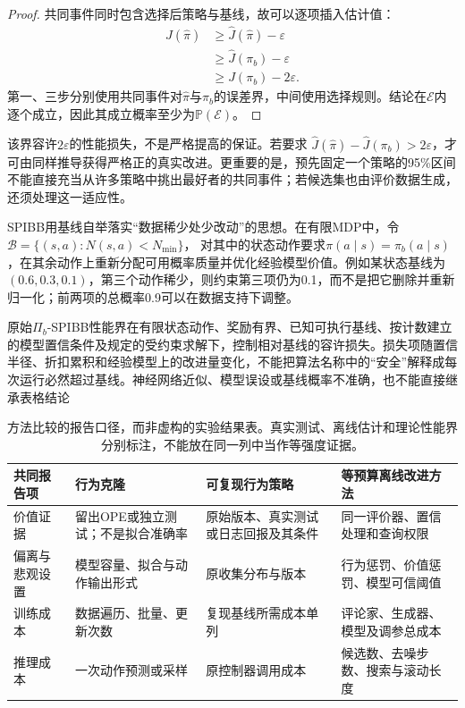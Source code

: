 \begin{proof}
  共同事件同时包含选择后策略与基线，故可以逐项插入估计值：
  \[
  \begin{aligned}
    J(\widehat\pi)
    &\geq\widehat J(\widehat\pi)-\varepsilon\\
    &\geq\widehat J(\pi_b)-\varepsilon\\
    &\geq J(\pi_b)-2\varepsilon.
  \end{aligned}
  \]
  第一、三步分别使用共同事件对$\widehat\pi$与$\pi_b$的误差界，中间使用选择规则。结论在$\mathcal E$内逐个成立，因此其成立概率至少为$\mathbb P(\mathcal E)$。
\end{proof}

该界容许$2\varepsilon$的性能损失，不是严格提高的保证。若要求
$\widehat J(\widehat\pi)-\widehat J(\pi_b)>2\varepsilon$，才可由同样推导获得严格正的真实改进。更重要的是，预先固定一个策略的95\%区间不能直接充当从许多策略中挑出最好者的共同事件；若候选集也由评价数据生成，还须处理这一适应性。

SPIBB用基线自举落实“数据稀少处少改动”的思想。在有限MDP中，令
$\mathcal B=\{(s,a):N(s,a)<N_{\min}\}$，
对其中的状态动作要求$\pi(a\mid s)=\pi_b(a\mid s)$，在其余动作上重新分配可用概率质量并优化经验模型价值。例如某状态基线为$(0.6,0.3,0.1)$，第三个动作稀少，则约束第三项仍为0.1，而不是把它删除并重新归一化；前两项的总概率0.9可以在数据支持下调整。

原始$\Pi_b$-SPIBB性能界在有限状态动作、奖励有界、已知可执行基线、按计数建立的模型置信条件及规定的受约束求解下，控制相对基线的容许损失。损失项随置信半径、折扣累积和经验模型上的改进量变化，不能把算法名称中的“安全”解释成每次运行必然超过基线。神经网络近似、模型误设或基线概率不准确，也不能直接继承表格结论

\begin{table}[t]
  \centering
  \small
  \begin{tabularx}{\linewidth}{p{28mm}XXX}
    \toprule
    共同报告项 & 行为克隆 & 可复现行为策略 & 等预算离线改进方法 \\
    \midrule
    价值证据 & 留出OPE或独立测试；不是拟合准确率 & 原始版本、真实测试或日志回报及其条件 & 同一评价器、置信处理和查询权限 \\
    偏离与悲观设置 & 模型容量、拟合与动作输出形式 & 原收集分布与版本 & 行为惩罚、价值惩罚、模型可信阈值 \\
    训练成本 & 数据遍历、批量、更新次数 & 复现基线所需成本单列 & 评论家、生成器、模型及调参总成本 \\
    推理成本 & 一次动作预测或采样 & 原控制器调用成本 & 候选数、去噪步数、搜索与滚动长度 \\
    \bottomrule
  \end{tabularx}
  \caption{方法比较的报告口径，而非虚构的实验结果表。真实测试、离线估计和理论性能界分别标注，不能放在同一列中当作等强度证据。}
  \label{tab:rl-information-reporting}
\end{table}

